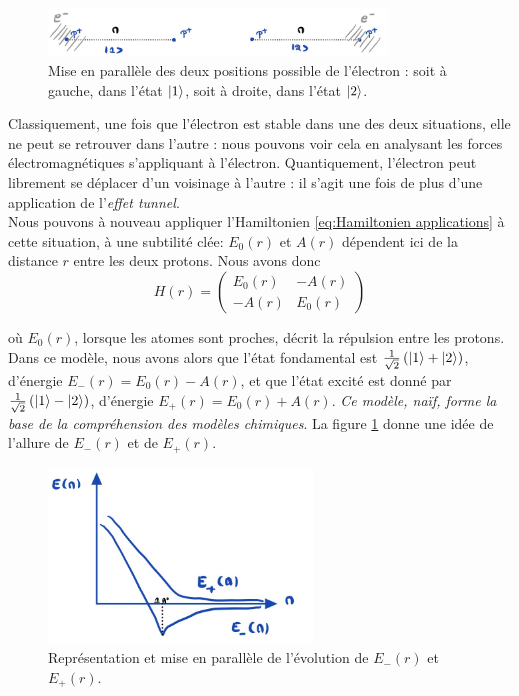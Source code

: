 \documentclass[../notesdecours.tex]{subfiles}
\begin{document}
\begin{figure}[h]
    \centering
    \includegraphics[width=9cm,scale=0.9]{Chapitre 5/Figure 5.jpg}
    \caption{Mise en parallèle des deux positions possible de l'électron : soit à gauche, dans l'état $\ket{1}$, soit à droite, dans l'état $\ket{2}$.}
\end{figure}

Classiquement, une fois que l'électron est stable dans une des deux situations, elle ne peut se retrouver dans l'autre : nous pouvons voir cela en analysant les forces électromagnétiques s'appliquant à l'électron. Quantiquement, l'électron peut librement se déplacer d'un voisinage à l'autre : il s'agit une fois de plus d'une application de l'\textit{effet tunnel}.\\

Nous pouvons à nouveau appliquer l'Hamiltonien \eqref{eq:Hamiltonien applications} à cette situation, à une subtilité clée: $E_0(r)$ et $A(r)$ dépendent ici de la distance $r$ entre les deux protons. Nous avons donc
\begin{equation}
    H(r) = \begin{pmatrix}
        E_0(r) & -A(r)\\
        -A(r) & E_0(r)
    \end{pmatrix}
\end{equation}

où $E_0(r)$, lorsque les atomes sont proches, décrit la répulsion entre les protons.\\

Dans ce modèle, nous avons alors que l'état fondamental est $\frac{1}{\sqrt{2}}\left(\ket{1}+\ket{2}\right)$, d'énergie $E_-(r) = E_0(r)-A(r)$, et que l'état excité est donné par $\frac{1}{\sqrt{2}}\left(\ket{1}-\ket{2}\right)$, d'énergie $E_+(r) = E_0(r)+A(r)$. \emph{Ce modèle, naïf, forme la base de la compréhension des modèles chimiques}. \color{purple} La figure \ref{fig:comparaison E+ et E-} donne une idée de l'allure de $E_-(r)$ et de $E_+(r)$.\color{black}

\begin{figure}[h]
    \centering
    \includegraphics[width=7cm,scale=0.5]{Chapitre 5/Figure 6.jpg}
    \caption{Représentation et mise en parallèle de l'évolution de $E_-(r)$ et $E_+(r)$.}
    \label{fig:comparaison E+ et E-}
\end{figure}
\end{document}
